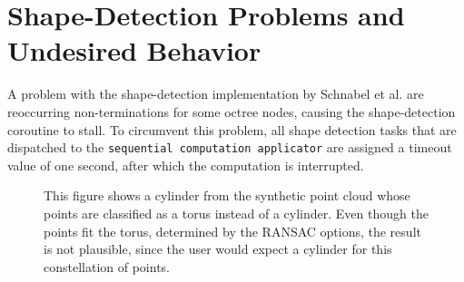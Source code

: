 \section{Shape-Detection Problems and Undesired Behavior}
\label{sec:shape_detection_problems}

A problem with the shape-detection implementation by Schnabel et al. \cite{schnabel-2007-software} are reoccurring non-terminations for some octree nodes, causing the shape-detection coroutine to stall. To circumvent this problem, all shape detection tasks that are dispatched to the \verb|sequential computation applicator| are assigned a timeout value of one second, after which the computation is interrupted. 

\begin{figure}
\centering
{}%
{}      
\caption[Implausible torus is detected instead of a more plausible cylinder. ]
{This figure shows a cylinder from the synthetic point cloud whose points are classified as a torus instead of a cylinder. Even though the points fit the torus, determined by the RANSAC options, the result is not plausible, since the user would expect a cylinder for this constellation of points. }
\label{fig:missfittedTorus}
\end{figure}

